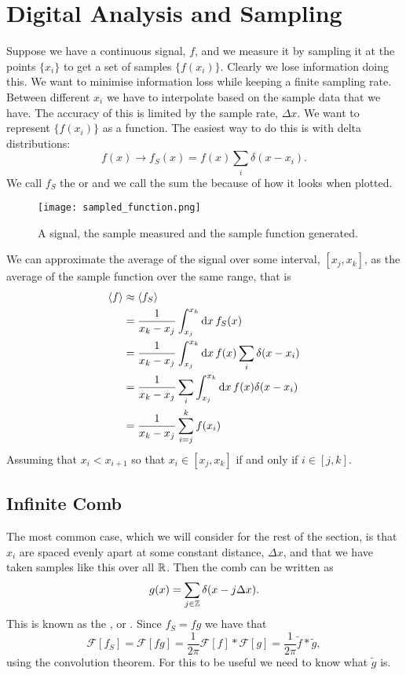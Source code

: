 \documentclass[a4paper]{article}
\newcommand{\FT}{\mathcal{F}}
\newcommand{\convolution}{\mathbin{*}}
\begin{document}
    \section{Digital Analysis and Sampling}
    Suppose we have a continuous signal, \(f\), and we measure it by sampling it at the points \(\{x_i\}\) to get a set of samples \(\{f(x_i)\}\).
    Clearly we lose information doing this.
    We want to minimise information loss while keeping a finite sampling rate.
    Between different \(x_i\) we have to interpolate based on the sample data that we have.
    The accuracy of this is limited by the sample rate, \(\Delta x\).
    We want to represent \(\{f(x_i)\}\) as a function.
    The easiest way to do this is with delta distributions:
    \[f(x) \rightarrow f_S(x) = f(x)\sum_i \delta(x - x_i).\]
    We call \(f_S\) the  or  and we call the sum the  because of how it looks when plotted.
    \begin{figure}[ht]
        \centering
        \texttt{[image: sampled\_function.png]}
        \caption{A signal, the sample measured and the sample function generated.}
    \end{figure}
    We can approximate the average of the signal over some interval, \([x_j, x_k]\), as the average of the sample function over the same range, that is
    \begin{align*}
        \langle{f}\rangle &\approx \langle{f_S}\rangle\\
        &= \frac{1}{x_k - x_j} \int_{x_j}^{x_k} \dd{x} f_S(x)\\
        &= \frac{1}{x_k - x_j} \int_{x_j}^{x_k} \dd{x} f(x)\sum_{i}\delta(x - x_i)\\
        &= \frac{1}{x_k - x_j}\sum_i \int_{x_j}^{x_k} \dd{x} f(x)\delta(x - x_i)\\
        &= \frac{1}{x_k - x_j}\sum_{i=j}^{k} f(x_i)
    \end{align*}
    Assuming that \(x_i < x_{i + 1}\) so that \(x_i \in [x_j, x_k]\) if and only if \(i \in [j, k]\).
    
    \subsection{Infinite Comb}
    The most common case, which we will consider for the rest of the section, is that \(x_i\) are spaced evenly apart at some constant distance, \(\Delta x\), and that we have taken samples like this over all \(\mathbb{R}\).
    Then the comb can be written as
    \[g(x) = \sum_{j\in\mathbb{Z}} \delta(x - j\Delta x).\]
    This is known as the , or .
    Since \(f_S = fg\) we have that
    \[\FT[f_S] = \FT[fg] = \frac{1}{2\pi}\FT[f]\convolution\FT[g] = \frac{1}{2\pi}\tilde{f}\convolution\tilde{g},\]
    using the convolution theorem.
    For this to be useful we need to know what \(\tilde{g}\) is.
    
\end{document}
